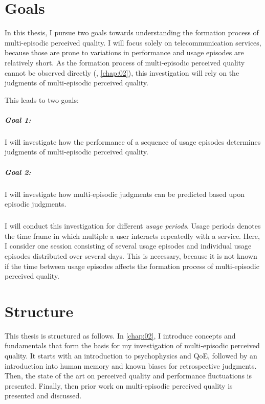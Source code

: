 
\section{Goals}
In this thesis, I pursue two goals towards understanding the formation process of multi-episodic perceived quality.
I will focus solely on telecommunication services, because those are prone to variations in performance and usage episodes are relatively short.
As the formation process of multi-episodic perceived quality cannot be observed directly (\cf, \autoref{chap:02}), this investigation will rely on the judgments of multi-episodic perceived quality.

This leads to two goals:

\subparagraph*{Goal 1:}
I will investigate how the performance of a sequence of usage episodes determines judgments of multi-episodic perceived quality.

\subparagraph*{Goal 2:}
I will investigate how multi-episodic judgments can be predicted based upon episodic judgments.

\subparagraph*{}
I will conduct this investigation for different \emph{usage periods}.
Usage periods denotes the time frame in which multiple a user interacts repeatedly with a service.
Here, I consider one session consisting of several usage episodes and individual usage episodes distributed over several days.
This is necessary, because it is not known if the time between usage episodes affects the formation process of multi-episodic perceived quality.

\section{Structure}
This thesis is structured as follows.
In \autoref{chap:02}, I introduce concepts and fundamentals that form the basis for my investigation of multi-episodic perceived quality.
It starts with an introduction to psychophysics and \ac{QoE}, followed by an introduction into human memory and known biases for retrospective judgments.
Then, the state of the art on perceived quality and performance fluctuations is presented.
Finally, then prior work on multi-episodic perceived quality is presented and discussed.

